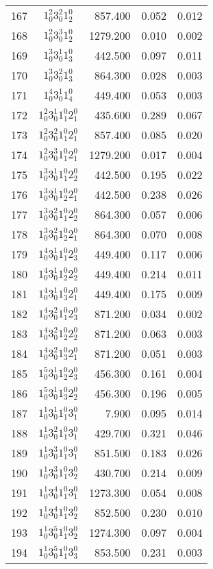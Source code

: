 \documentclass{revtex4}
\begin{document}
\begin{table}
\begin{tabular}{rcrrr}
167&$1_0^2 3_0^2 1_2^0$& 857.400& 0.052& 0.012\\
168&$1_0^2 3_0^3 1_2^0$& 1279.200& 0.010& 0.002\\
169&$1_0^3 3_0^1 1_3^0$& 442.500& 0.097& 0.011\\
170&$1_0^3 3_0^2 1_3^0$& 864.300& 0.028& 0.003\\
171&$1_0^4 3_0^1 1_4^0$& 449.400& 0.053& 0.003\\
172&$1_0^2 3_0^1 1_1^0 2_1^0$& 435.600& 0.289& 0.067\\
173&$1_0^2 3_0^2 1_1^0 2_1^0$& 857.400& 0.085& 0.020\\
174&$1_0^2 3_0^3 1_1^0 2_1^0$& 1279.200& 0.017& 0.004\\
175&$1_0^3 3_0^1 1_1^0 2_2^0$& 442.500& 0.195& 0.022\\
176&$1_0^3 3_0^1 1_2^0 2_1^0$& 442.500& 0.238& 0.026\\
177&$1_0^3 3_0^2 1_1^0 2_2^0$& 864.300& 0.057& 0.006\\
178&$1_0^3 3_0^2 1_2^0 2_1^0$& 864.300& 0.070& 0.008\\
179&$1_0^4 3_0^1 1_1^0 2_3^0$& 449.400& 0.117& 0.006\\
180&$1_0^4 3_0^1 1_2^0 2_2^0$& 449.400& 0.214& 0.011\\
181&$1_0^4 3_0^1 1_3^0 2_1^0$& 449.400& 0.175& 0.009\\
182&$1_0^4 3_0^2 1_1^0 2_3^0$& 871.200& 0.034& 0.002\\
183&$1_0^4 3_0^2 1_2^0 2_2^0$& 871.200& 0.063& 0.003\\
184&$1_0^4 3_0^2 1_3^0 2_1^0$& 871.200& 0.051& 0.003\\
185&$1_0^5 3_0^1 1_2^0 2_3^0$& 456.300& 0.161& 0.004\\
186&$1_0^5 3_0^1 1_3^0 2_2^0$& 456.300& 0.196& 0.005\\
187&$1_0^1 3_0^1 1_1^0 3_1^0$& 7.900& 0.095& 0.014\\
188&$1_0^1 3_0^2 1_1^0 3_1^0$& 429.700& 0.321& 0.046\\
189&$1_0^1 3_0^3 1_1^0 3_1^0$& 851.500& 0.183& 0.026\\
190&$1_0^1 3_0^3 1_1^0 3_2^0$& 430.700& 0.214& 0.009\\
191&$1_0^1 3_0^4 1_1^0 3_1^0$& 1273.300& 0.054& 0.008\\
192&$1_0^1 3_0^4 1_1^0 3_2^0$& 852.500& 0.230& 0.010\\
193&$1_0^1 3_0^5 1_1^0 3_2^0$& 1274.300& 0.097& 0.004\\
194&$1_0^1 3_0^5 1_1^0 3_3^0$& 853.500& 0.231& 0.003\\

\end{tabular}
\end{table}
\end{document}
